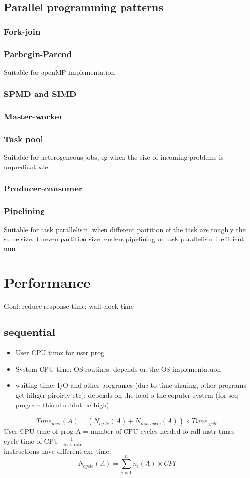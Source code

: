 \documentclass{article}
\begin{document}
\subsection{Parallel programming patterns}
\subsubsection*{Fork-join}
\subsubsection*{Parbegin-Parend}
Suitable for openMP implementation
\subsubsection*{SPMD and SIMD}
\subsubsection*{Master-worker}
\subsubsection*{Task pool}
Suitable for heterogeneous jobs, eg when the size of incoming problems is unpredicatbale
\subsubsection*{Producer-consumer}
\subsubsection*{Pipelining}
Suitable for task parallelism, when different partition of the task are roughly the same size. Uneven partition size renders pipelining or 
task parallelism inefficient 
uuu
\section{Performance}
Goal: reduce response time: wall clock time
\subsection{sequential}

\begin{itemize}
    \item User CPU time: for user prog
    \item System CPU time: OS routines: depends on the OS implementatuon 
    \item waiting time: I/O and other porgrames (due to time sharing, other programs get hihger piroirty etc): depends on the load o the coputer system (for seq program this shouldnt be high)
\end{itemize}
\[Time_{user}(A) =\left( N_{cycle}(A) + N_{mm\_cycle}(A)\right)\times Time_{cycle}\]
User CPU time of prog A = number of CPU cycles needed fo rall instr times cycle time of CPU $\frac{1}{\text{clock rate}}$\\
instructions have different exe time: 
\[N_{cycle}(A) = \sum_{i=1}^{n}n_i(A)\times CPI\]
\end{document}
